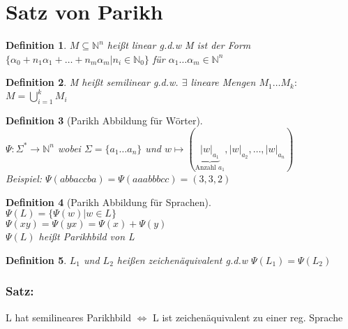     \section{Satz von Parikh}
    \newtheorem{def1}{Definition}[section]
	  \begin{def1}
	  	$M\subseteq \mathds{N}^n$ heißt linear g.d.w M ist der Form \\ $\{\alpha_0+n_1\alpha_1+\dots+n_m\alpha_m|n_i\in\mathds{N}_0\}$ für $\alpha_1 \dots \alpha_m \in \mathds{N}^n$
	  \end{def1}
	  \begin{def1}
	  	M heißt semilinear g.d.w.
	  	$\exists$ lineare Mengen $M_1\dots M_k:$\\
	  	$M=\bigcup\limits_{i=1}^kM_i$
	  \end{def1}
	  \begin{def1}[Parikh Abbildung für Wörter] \ \\
	  	$\Psi: \Sigma^*\rightarrow \mathds{N}^n$ wobei  $\Sigma=\{a_1\dots a_n\}$ und $w\mapsto (\underbrace{|w|_{a_1}}_{\text{Anzahl }a_1} ,|w|_{a_2},\dots, |w|_{a_n})$\\
	  	  Beispiel: $\Psi(abbaccba)=\Psi(aaabbbcc)=(3,3,2)$\\
	  \end{def1}
	\begin{def1}[Parikh Abbildung für Sprachen]\ \\
		$\Psi(L)=\{\Psi(w)|w\in L\}$\\
		$\Psi(xy)=\Psi(yx)=\Psi(x)+\Psi(y)$\\
		$\Psi(L)$ heißt Parikhbild von L
	\end{def1}
	\begin{def1}
		$L_1$ und $L_2$ heißen \emph{zeichenäquivalent} g.d.w $\Psi(L_1)=\Psi(L_2)$\\
	\end{def1}
	\subsubsection{Satz:}
	L hat semilineares Parikhbild $\Leftrightarrow$ L ist zeichenäquivalent zu einer reg. Sprache
